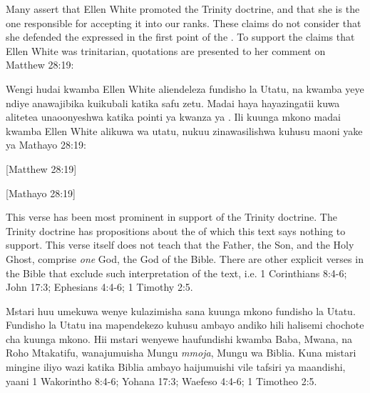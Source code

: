 



Many assert that Ellen White promoted the Trinity doctrine, and that she is the one responsible for accepting it into our ranks. These claims do not consider that she defended the  expressed in the first point of the . To support the claims that Ellen White was trinitarian, quotations are presented to her comment on Matthew 28:19:


Wengi hudai kwamba Ellen White aliendeleza fundisho la Utatu, na kwamba yeye ndiye anawajibika kuikubali katika safu zetu. Madai haya hayazingatii kuwa alitetea  unaoonyeshwa katika pointi ya kwanza ya . Ili kuunga mkono madai kwamba Ellen White alikuwa wa utatu, nukuu zinawasilishwa kuhusu maoni yake ya Mathayo 28:19:


[Matthew 28:19]


[Mathayo 28:19]


This verse has been most prominent in support of the Trinity doctrine. The Trinity doctrine has propositions about the  of which this text says nothing to support. This verse itself does not teach that the Father, the Son, and the Holy Ghost, comprise \textit{one} God, the God of the Bible. There are other explicit verses in the Bible that exclude such interpretation of the text, i.e. 1 Corinthians 8:4-6; John 17:3; Ephesians 4:4-6; 1 Timothy 2:5.


Mstari huu umekuwa wenye kulazimisha sana kuunga mkono fundisho la Utatu. Fundisho la Utatu ina mapendekezo kuhusu  ambayo andiko hili halisemi chochote cha kuunga mkono. Hii mstari wenyewe haufundishi kwamba Baba, Mwana, na Roho Mtakatifu, wanajumuisha Mungu \textit{mmoja}, Mungu wa Biblia. Kuna mistari mingine iliyo wazi katika Biblia ambayo haijumuishi vile tafsiri ya maandishi, yaani 1 Wakorintho 8:4-6; Yohana 17:3; Waefeso 4:4-6; 1 Timotheo 2:5.


